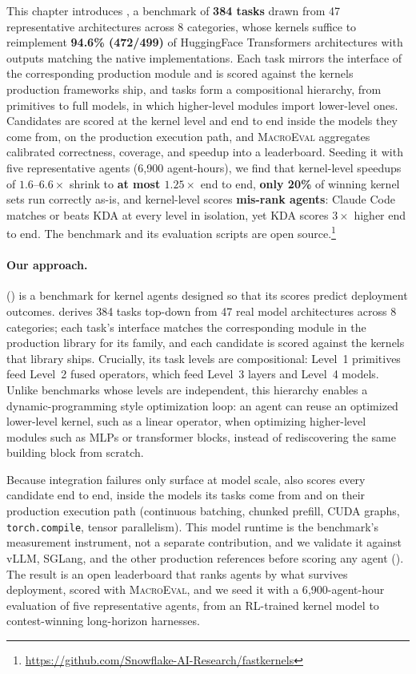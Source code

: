This chapter introduces \FastKernels, a benchmark of \textbf{384 tasks} drawn from 47 representative architectures across 8 categories, whose kernels suffice to reimplement \textbf{94.6\% (472/499)} of HuggingFace Transformers architectures with outputs matching the native implementations.
Each task mirrors the interface of the corresponding production module and is scored against the kernels production frameworks ship, and tasks form a compositional hierarchy, from primitives to full models, in which higher-level modules import lower-level ones.
Candidates are scored at the kernel level and end to end inside the models they come from, on the production execution path, and \textsc{MacroEval} aggregates calibrated correctness, coverage, and speedup into a leaderboard.
Seeding it with five representative agents (6{,}900 agent-hours), we find that kernel-level speedups of $1.6$--$6.6\times$ shrink to \textbf{at most $1.25\times$} end to end, \textbf{only 20\%} of winning kernel sets run correctly as-is, and kernel-level scores \textbf{mis-rank agents}: Claude Code matches or beats KDA at every level in isolation, yet KDA scores $3\times$ higher end to end.
The benchmark and its evaluation scripts are open source.\footnote{\url{https://github.com/Snowflake-AI-Research/fastkernels}}

\paragraph{Our approach.}
\FastKernels () is a benchmark for kernel agents designed so that its scores predict deployment outcomes.
\FastKernels derives 384 tasks top-down from 47 real model architectures across 8 categories; each task's interface matches the corresponding module in the production library for its family, and each candidate is scored against the kernels that library ships.
Crucially, its task levels are compositional: Level~1 primitives feed Level~2 fused operators, which feed Level~3 layers and Level~4 models.
Unlike benchmarks whose levels are independent, this hierarchy enables a dynamic-programming style optimization loop: an agent can reuse an optimized lower-level kernel, such as a linear operator, when optimizing higher-level modules such as MLPs or transformer blocks, instead of rediscovering the same building block from scratch.

Because integration failures only surface at model scale, \FastKernels also scores every candidate end to end, inside the models its tasks come from and on their production execution path (continuous batching, chunked prefill, CUDA graphs, \texttt{torch.compile}, tensor parallelism).
This model runtime is the benchmark's measurement instrument, not a separate contribution, and we validate it against vLLM, SGLang, and the other production references before scoring any agent ().
The result is an open leaderboard that ranks agents by what survives deployment, scored with \textsc{MacroEval}, and we seed it with a 6{,}900-agent-hour evaluation of five representative agents, from an RL-trained kernel model to contest-winning long-horizon harnesses.

